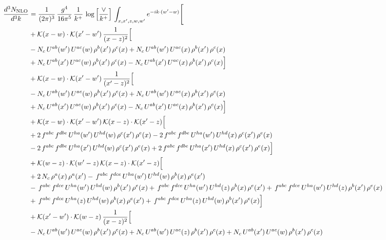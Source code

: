 \documentclass[10pt]{article}
\numberwithin{equation}{section}
\begin{document}
\begin{align}
\frac{d^{3}N_{\mathrm{NLO}}}{d^{3}k} & = \frac{1}{(2\pi)^{3}}\,\frac{g^{4}}{16\pi^{5}}\,\frac{1}{k^{+}}\,\log\Big[\frac{\vee}{k^{+}}\Big]\,\int_{x,x',z,w,w'}e^{-ik\cdot(w'-w)}\Bigg[ \notag\\
& +\mathcal{K}(x-w)\cdot\mathcal{K}(x'-w')\,\frac{1}{(x-z)^{2}}\Big[\notag\\
& -N_{c}\,U^{ab}(w')\,U^{ac}(w)\,\rho^{b}(x')\,\rho^{c}(x) +N_{c}\,U^{ab}(w')\,U^{ac}(x)\,\rho^{b}(x')\,\rho^{c}(x)\notag\\
& +N_{c}\,U^{ab}(x')\,U^{ac}(w)\,\rho^{b}(x')\,\rho^{c}(x) -N_{c}\,U^{ab}(x')\,U^{ac}(x)\,\rho^{b}(x')\,\rho^{c}(x)\Big]\notag\\
& +\mathcal{K}(x-w)\cdot\mathcal{K}(x'-w')\,\frac{1}{(x'-z)^{2}}\Big[\notag\\
& -N_{c}\,U^{ab}(w')\,U^{ac}(w)\,\rho^{b}(x')\,\rho^{c}(x) +N_{c}\,U^{ab}(w')\,U^{ac}(x)\,\rho^{b}(x')\,\rho^{c}(x)\notag\\
& +N_{c}\,U^{ab}(x')\,U^{ac}(w)\,\rho^{b}(x')\,\rho^{c}(x) -N_{c}\,U^{ab}(x')\,U^{ac}(x)\,\rho^{b}(x')\,\rho^{c}(x)\Big]\notag\\
& +\mathcal{K}(x-w)\cdot\mathcal{K}(x'-w')\,\mathcal{K}(x-z)\cdot\mathcal{K}(x'-z)\Big[\notag\\
& +2\,f^{abc}\,f^{dbe}\,U^{ha}(w')\,U^{hd}(w)\,\rho^{c}(x')\,\rho^{e}(x) -2\,f^{abc}\,f^{dbe}\,U^{ha}(w')\,U^{hd}(x)\,\rho^{c}(x')\,\rho^{e}(x)\notag\\
& -2\,f^{abc}\,f^{dbe}\,U^{ha}(x')\,U^{hd}(w)\,\rho^{c}(x')\,\rho^{e}(x) +2\,f^{abc}\,f^{dbe}\,U^{ha}(x')\,U^{hd}(x)\,\rho^{c}(x')\,\rho^{e}(x)\Big]\notag\\
& +\mathcal{K}(w-z)\cdot\mathcal{K}(w'-z)\,\mathcal{K}(x-z)\cdot\mathcal{K}(x'-z)\Big[\notag\\
& +2\,N_{c}\,\rho^{a}(x)\,\rho^{a}(x') -\,f^{abc}\,f^{dce}\,U^{ha}(w')\,U^{hd}(w)\,\rho^{b}(x)\,\rho^{e}(x')\notag\\
& -\,f^{abc}\,f^{dce}\,U^{ha}(w')\,U^{hd}(w)\,\rho^{b}(x')\,\rho^{e}(x) +\,f^{abc}\,f^{dce}\,U^{ha}(w')\,U^{hd}(z)\,\rho^{b}(x)\,\rho^{e}(x') +\,f^{abc}\,f^{dce}\,U^{ha}(w')\,U^{hd}(z)\,\rho^{b}(x')\,\rho^{e}(x)\notag\\
& +\,f^{abc}\,f^{dce}\,U^{ha}(z)\,U^{hd}(w)\,\rho^{b}(x)\,\rho^{e}(x') +\,f^{abc}\,f^{dce}\,U^{ha}(z)\,U^{hd}(w)\,\rho^{b}(x')\,\rho^{e}(x)\Big]\notag\\
& +\mathcal{K}(x'-w')\cdot\mathcal{K}(w-z)\,\frac{1}{(x-z)^{2}}\Big[\notag\\
& -N_{c}\,U^{ab}(w')\,U^{ac}(w)\,\rho^{b}(x')\,\rho^{c}(x) +N_{c}\,U^{ab}(w')\,U^{ac}(z)\,\rho^{b}(x')\,\rho^{c}(x) +N_{c}\,U^{ab}(x')\,U^{ac}(w)\,\rho^{b}(x')\,\rho^{c}(x)\notag\\

\end{align}
\end{document}
